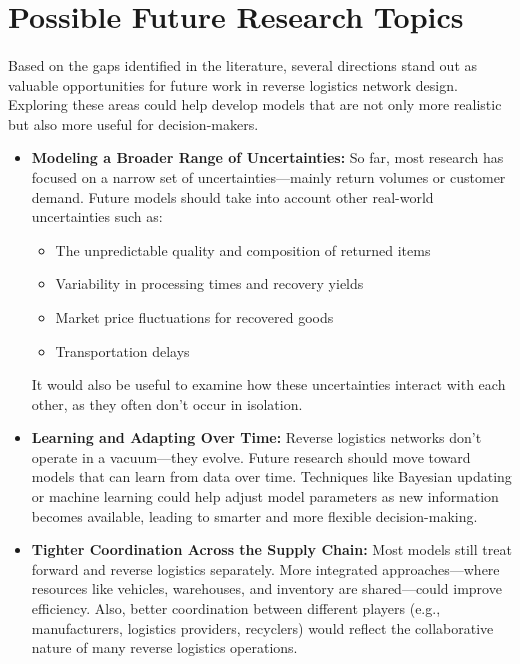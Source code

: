 \section{Possible Future Research Topics}

\paragraph{} Based on the gaps identified in the literature, several directions stand out as valuable opportunities for future work in reverse logistics network design. Exploring these areas could help develop models that are not only more realistic but also more useful for decision-makers.

\begin{itemize}[label=, leftmargin=2mm]
    \item \textbf{Modeling a Broader Range of Uncertainties:}
        So far, most research has focused on a narrow set of uncertainties—mainly return volumes or customer demand. Future models should take into account other real-world uncertainties such as:\begin{itemize}
            \item The unpredictable quality and composition of returned items
            \item Variability in processing times and recovery yields
            \item Market price fluctuations for recovered goods
            \item Transportation delays
        \end{itemize}
        It would also be useful to examine how these uncertainties interact with each other, as they often don’t occur in isolation.

    \item \textbf{Learning and Adapting Over Time:}
        Reverse logistics networks don’t operate in a vacuum—they evolve. Future research should move toward models that can learn from data over time. Techniques like Bayesian updating or machine learning could help adjust model parameters as new information becomes available, leading to smarter and more flexible decision-making.

    \item \textbf{Tighter Coordination Across the Supply Chain:}
        Most models still treat forward and reverse logistics separately. More integrated approaches—where resources like vehicles, warehouses, and inventory are shared—could improve efficiency. Also, better coordination between different players (e.g., manufacturers, logistics providers, recyclers) would reflect the collaborative nature of many reverse logistics operations.


\end{itemize}
